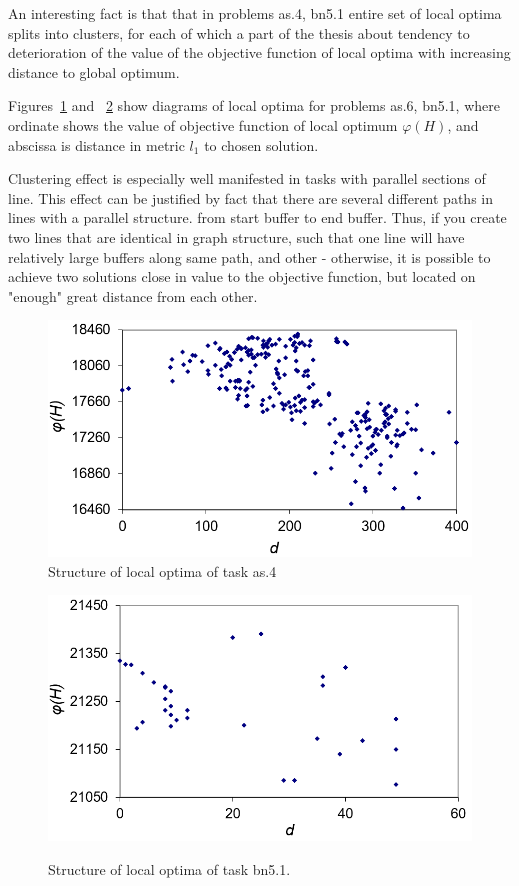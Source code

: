 \documentclass{ifacconf}
\begin{document}
An interesting fact is that
that in problems as.4, bn5.1 entire set of local optima splits
into clusters, for each of which a part of the thesis about tendency to
deterioration of the value of the objective function of local optima
with increasing distance to global optimum.

Figures~\ref{fig:multistart_klaster} and ~\ref{klaster_bn5_1} show diagrams of local optima for problems
as.6, bn5.1, where ordinate shows the value of objective function of local optimum $\varphi(H)$, and abscissa is
distance in metric $l_1$ to chosen solution.

Clustering effect is especially well manifested in tasks with parallel sections of line.
This effect can be justified by fact that there are several different paths in lines with a parallel structure.
from start buffer to end buffer. Thus, if you create two lines that are identical in graph structure,
such that one line will have relatively large buffers along same path, and other -
otherwise, it is possible to achieve two solutions close in value to the objective function, but located on "enough"
great distance from each other.

 \begin{figure}[h!]
	\centering
	\includegraphics[scale=0.5]{multistart_klaster}
  \caption{Structure of local optima of task as.4 } \label{fig:multistart_klaster}
  \end{figure}
\begin{figure}[h!]
	\begin{center}
		\includegraphics[scale=0.5]{klaster_bn5_1.png}\\
		\caption{Structure of local optima of task bn5.1.} \label{klaster_bn5_1}
	\end{center}
\end{figure} 
\end{document}

